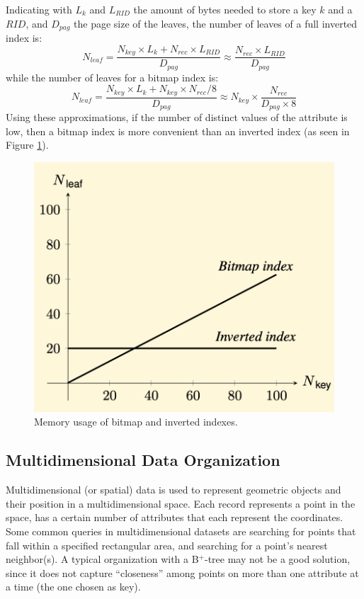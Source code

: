 Indicating with $L_k$ and $L_{RID}$ the amount of bytes needed to store a key $k$ and a $RID$, and $D_{pag}$ the page size of the leaves, the number of leaves of a full inverted index is:
\begin{equation*}
    N_{leaf} = \dfrac{N_{key} \times L_k + N_{rec} \times L_{RID}}{D_{pag}} \approx \dfrac{N_{rec} \times L_{RID}}{D_{pag}}
\end{equation*}
while the number of leaves for a bitmap index is:
\begin{equation*}
    N_{leaf} = \dfrac{N_{key} \times L_k + N_{key} \times N_{rec}/8}{D_{pag}} \approx N_{key} \times \dfrac{N_{rec}}{D_{pag} \times 8}
\end{equation*}
Using these approximations, if the number of distinct values of the attribute is low, then a bitmap index is more convenient than an inverted index (as seen in Figure \ref{fig:bitmap-vs-inverted}). 

\begin{figure}[h]
    \centering
    \includegraphics[width=0.5\linewidth]{img/bitmap_vs_inverted.png}
    \caption{Memory usage of bitmap and inverted indexes.}
    \label{fig:bitmap-vs-inverted}
\end{figure}

\subsection{Multidimensional Data Organization}

Multidimensional (or spatial) data is used to represent geometric objects and their position in a multidimensional space. Each record represents a point in the space, has a certain number of attributes that each represent the coordinates. Some common queries in multidimensional datasets are searching for points that fall within a specified rectangular area, and searching for a point's nearest neighbor(s). A typical organization with a B$^+$-tree may not be a good solution, since it does not capture ``closeness'' among points on more than one attribute at a time (the one chosen as key).

